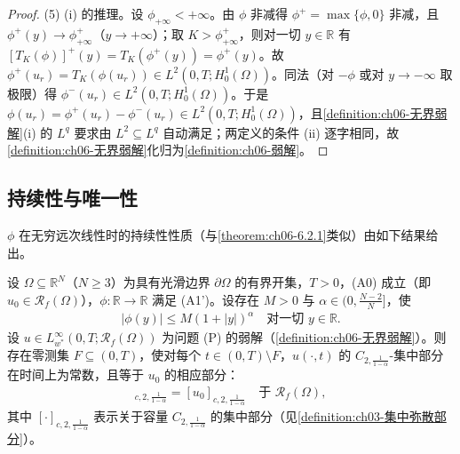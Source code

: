 \documentclass[../../main.tex]{subfiles}%
\begin{document}
\begin{proof}
(5) (i) 的推理。设 $\phi_{+\infty}<+\infty$。由 $\phi$ 非减得 $\phi^+=\max\{\phi,0\}$ 非减，且 $\phi^+(y)\to\phi^+_{+\infty}$（$y\to+\infty$）；取 $K>\phi^+_{+\infty}$，则对一切 $y\in\mathbb{R}$ 有 $[T_K(\phi)]^+(y)=T_K(\phi^+(y))=\phi^+(y)$。故 $\phi^+(u_r)=T_K(\phi(u_r))\in L^2(0,T;H^1_0(\Omega))$。同法（对 $-\phi$ 或对 $y\to-\infty$ 取极限）得 $\phi^-(u_r)\in L^2(0,T;H^1_0(\Omega))$。于是 $\phi(u_r)=\phi^+(u_r)-\phi^-(u_r)\in L^2(0,T;H^1_0(\Omega))$，且\cref{definition:ch06-无界弱解}(i) 的 $L^q$ 要求由 $L^2\subseteq L^q$ 自动满足；两定义的条件 (ii) 逐字相同，故\cref{definition:ch06-无界弱解}化归为\cref{definition:ch06-弱解}。
\end{proof}

\subsection{持续性与唯一性}\label{subsection:ch06-无界持续唯一}

$\phi$ 在无穷远次线性时的持续性性质（与\cref{theorem:ch06-6.2.1}类似）由如下结果给出。

\begin{theorem}\label{theorem:ch6-正则化}
设 $\Omega\subseteq\mathbb{R}^N$（$N\geqslant3$）为具有光滑边界 $\partial\Omega$ 的有界开集，$T>0$，(A0) 成立（即 $u_0\in\mathscr{R}_f(\Omega)$），$\phi:\mathbb{R}\to\mathbb{R}$ 满足 (A1')。设存在 $M>0$ 与 $\alpha\in(0,\frac{N-2}{N}]$，使
\begin{align*}
|\phi(y)|\leqslant M(1+|y|)^{\alpha}\quad\text{对一切 }y\in\mathbb{R}.
\end{align*}
设 $u\in L^\infty_{w^*}(0,T;\mathscr{R}_f(\Omega))$ 为问题 (P) 的弱解（\cref{definition:ch06-无界弱解}）。则存在零测集 $F\subseteq(0,T)$，使对每个 $t\in(0,T)\setminus F$，$u(\cdot,t)$ 的 $C_{2,\frac{1}{1-\alpha}}$-集中部分在时间上为常数，且等于 $u_0$ 的相应部分：
\begin{align}
[u(\cdot,t)]_{c,2,\frac{1}{1-\alpha}}=[u_0]_{c,2,\frac{1}{1-\alpha}}\quad\text{于 }\mathscr{R}_f(\Omega), \label{align:ch6-6.135}
\end{align}
其中 $[\cdot]_{c,2,\frac{1}{1-\alpha}}$ 表示关于容量 $C_{2,\frac{1}{1-\alpha}}$ 的集中部分（见\cref{definition:ch03-集中弥散部分}）。
\end{theorem}
\end{document}
